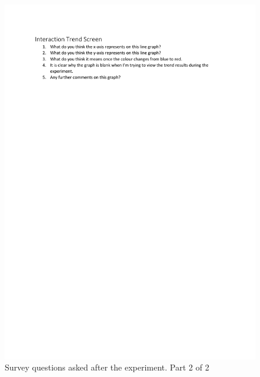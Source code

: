 \documentclass{l4proj}
\begin{document}
\begin{appendices}
    \begin{figure}[!htb]
        \centering
        \includegraphics[width=1.0\linewidth]{images/contact-survey_questions 2.pdf}

        \caption{ Survey questions asked after the experiment. Part 2 of 2 }

        \label{fig:survey-questions-2}
    \end{figure}


\end{appendices}
\end{document}
